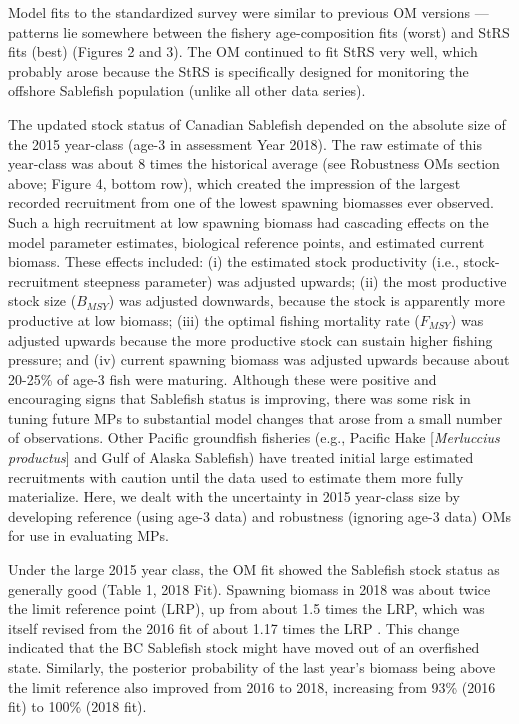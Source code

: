 \documentclass[11pt]{book}
\begin{document}
Model fits to the standardized survey were similar to previous OM versions --- patterns lie somewhere between the fishery age-composition fits (worst) and StRS fits (best) (Figures 2 and 3). The OM continued to fit StRS very well, which probably arose because the StRS is specifically designed for monitoring the offshore Sablefish population (unlike all other data series).

The updated stock status of Canadian Sablefish depended on the absolute size of the 2015 year-class (age-3 in assessment Year 2018). The raw estimate of this year-class was about 8 times the historical average (see Robustness OMs section above; Figure 4, bottom row), which created the impression of the largest recorded recruitment from one of the lowest spawning biomasses ever observed. Such a high recruitment at low spawning biomass had cascading effects on the model parameter estimates, biological reference points, and estimated current biomass. These effects included: (i) the estimated stock productivity (i.e., stock-recruitment steepness parameter) was adjusted upwards; (ii) the most productive stock size (\(B_{MSY}\)) was adjusted downwards, because the stock is apparently more productive at low biomass; (iii) the optimal fishing mortality rate (\(F_{MSY}\)) was adjusted upwards because the more productive stock can sustain higher fishing pressure; and (iv) current spawning biomass was adjusted upwards because about 20-25\% of age-3 fish were maturing. Although these were positive and encouraging signs that Sablefish status is improving, there was some risk in tuning future MPs to substantial model changes that arose from a small number of observations. Other Pacific groundfish fisheries (e.g., Pacific Hake {[}\emph{Merluccius productus}{]} and Gulf of Alaska Sablefish) have treated initial large estimated recruitments with caution until the data used to estimate them more fully materialize. Here, we dealt with the uncertainty in 2015 year-class size by developing reference (using age-3 data) and robustness (ignoring age-3 data) OMs for use in evaluating MPs.

Under the large 2015 year class, the OM fit showed the Sablefish stock status as generally good (Table 1, 2018 Fit). Spawning biomass in 2018 was about twice the limit reference point (LRP), up from about 1.5 times the LRP, which was itself revised from the 2016 fit of about 1.17 times the LRP . This change indicated that the BC Sablefish stock might have moved out of an overfished state. Similarly, the posterior probability of the last year's biomass being above the limit reference also improved from 2016 to 2018, increasing from 93\% (2016 fit) to 100\% (2018 fit).
\end{document}
